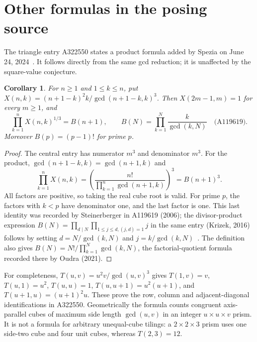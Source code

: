 \documentclass[11pt]{article}
\newtheorem{corollary}[theorem]{Corollary}
\begin{document}
\section{Other formulas in the posing source}
The triangle entry A322550 states a product formula added by Spezia
on June 24, 2024~\cite{triangle}. It follows directly from the same gcd
reduction; it is unaffected by the square-value conjecture.

\begin{corollary}\label{cor:product}
For $n\geq1$ and $1\leq k\leq n$, put
$X(n,k)=(n+1-k)^2k/\gcd(n+1-k,k)^3$.
Then $X(2m-1,m)=1$ for every $m\geq1$, and
\[
 \prod_{k=1}^n X(n,k)^{1/3}=B(n+1),\qquad
 B(N)=\prod_{k=1}^N\frac{k}{\gcd(k,N)}\quad\text{(A119619)}.
\]
Moreover $B(p)=(p-1)!$ for prime $p$.
\end{corollary}
\begin{proof}
The central entry has numerator $m^3$ and denominator $m^3$.
For the product, $\gcd(n+1-k,k)=\gcd(n+1,k)$ and
\[
 \prod_{k=1}^n X(n,k)
 =\left(\frac{n!}{\prod_{k=1}^n\gcd(n+1,k)}\right)^3
 =B(n+1)^3.
\]
All factors are positive, so taking the real cube root is valid.
For prime $p$, the factors with $k<p$ have denominator one, and
the last factor is one. This last identity was recorded by
Steinerberger in A119619 (2006); the divisor-product expression
$B(N)=\prod_{d\mid N}\prod_{1\leq j\leq d,(j,d)=1}j$
in the same entry (Krizek, 2016) follows by setting $d=N/\gcd(k,N)$
and $j=k/\gcd(k,N)$~\cite{product}.
The definition also gives $B(N)=N!/\prod_{k=1}^N\gcd(k,N)$,
the factorial-quotient formula recorded there by Oudra (2021).
\end{proof}

For completeness, $T(u,v)=u^2v/\gcd(u,v)^3$ gives
$T(1,v)=v$, $T(u,1)=u^2$, $T(u,u)=1$,
$T(u,u+1)=u^2(u+1)$, and $T(u+1,u)=(u+1)^2u$.
These prove the row, column and adjacent-diagonal identifications in
A322550. Geometrically the formula counts congruent axis-parallel cubes
of maximum side length $\gcd(u,v)$ in an integer $u\times u\times v$
prism. It is not a formula for arbitrary unequal-cube tilings: a
$2\times2\times3$ prism uses one side-two cube and four unit cubes,
whereas $T(2,3)=12$.
\end{document}
